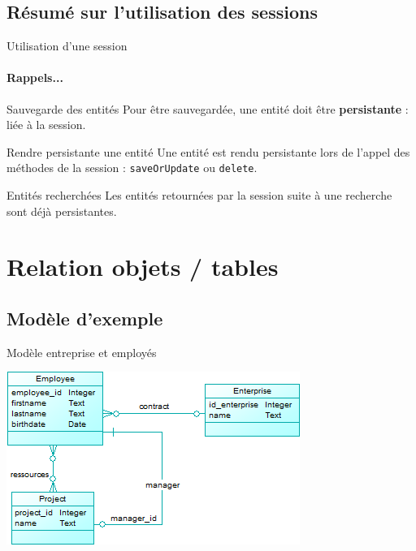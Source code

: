 \documentclass[compress]{beamer}%
\begin{document}
\subsection{Résumé sur l'utilisation des sessions}

\begin{frame}{Utilisation d'une session}
	\framesubtitle{Rappels...}
	
	\begin{block}{Sauvegarde des entités}
	Pour être sauvegardée, une entité doit être \textbf{persistante} : liée à la session.
	\end{block}
	
	\pause
	\begin{block}{Rendre persistante une entité}
	Une entité est rendu persistante lors de l'appel des méthodes de la session : \texttt{saveOrUpdate} ou \texttt{delete}.
	\end{block}
	
	\pause
	\begin{block}{Entités recherchées}
	Les entités retournées par la session suite à une recherche sont déjà persistantes.
	\end{block}	
\end{frame}
	
\section{Relation objets / tables}

\subsection{Modèle d'exemple}

\begin{frame}{Modèle entreprise et employés}
	\begin{center}
	\includegraphics{images/model_employees_full.png}	
	\end{center}
\end{frame}
\end{document}
